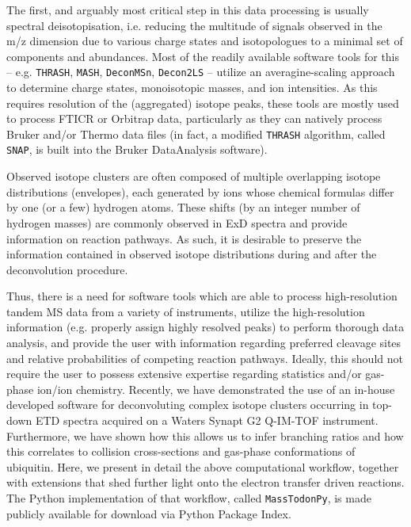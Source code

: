 \documentclass[journal=ancham, manuscript=article, layout=twocolumn]{achemso}
\begin{document}
The first, and arguably most critical step in this data processing is usually spectral deisotopisation, i.e. reducing the multitude of signals observed in the m/z dimension due to various charge states and isotopologues to a minimal set of components and abundances.
Most of the readily available software tools for this – e.g. {\tt THRASH}\cite{horn2000automated}, {\tt MASH}\cite{guner2014mash,cai2016mash}, {\tt DeconMSn}\cite{mayampurath2008deconmsn}, {\tt Decon2LS}\cite{jaitly2009decon2ls} – utilize an averagine-scaling approach\cite{senko1995determination} to determine charge states, monoisotopic masses, and ion intensities.
As this requires resolution of the (aggregated) isotope peaks, these tools are mostly used to process FTICR or Orbitrap data, particularly as they can natively process Bruker and/or Thermo data files (in fact, a modified {\tt THRASH} algorithm, called {\tt SNAP}, is built into the Bruker DataAnalysis software). 

Observed isotope clusters are often composed of multiple overlapping isotope distributions (envelopes), each  generated by ions whose chemical formulas differ by one (or a few) hydrogen atoms. 
These shifts (by an integer number of hydrogen masses) are commonly observed in ExD spectra and provide information on reaction pathways\cite{lermyte2017conformational,o2006long,tsybin2007ion}. 
As such, it is desirable to preserve the information contained in observed isotope distributions during and after the deconvolution procedure.

Thus, there is a need for software tools which are able to process high-resolution tandem MS data from a variety of instruments, utilize the high-resolution information (e.g. properly assign highly resolved peaks) to perform thorough data analysis, and provide the user with information regarding preferred cleavage sites and relative probabilities of competing reaction pathways.
Ideally, this should not require the user to possess extensive expertise regarding statistics and/or gas-phase ion/ion chemistry.
Recently, we have demonstrated the use of an in-house developed software for deconvoluting complex isotope clusters occurring in top-down ETD spectra acquired on a Waters Synapt G2 Q-IM-TOF instrument\cite{lermyte2015understanding}.
Furthermore, we have shown how this allows us to infer branching ratios and how this correlates to collision cross-sections and gas-phase conformations of ubiquitin\cite{lermyte2017conformational}.
Here, we present in detail the above computational workflow, together with extensions that shed further light onto the electron transfer driven reactions.
The Python implementation of that workflow, called {\tt MassTodonPy}, is made publicly available for download via Python Package Index. 
\end{document}
